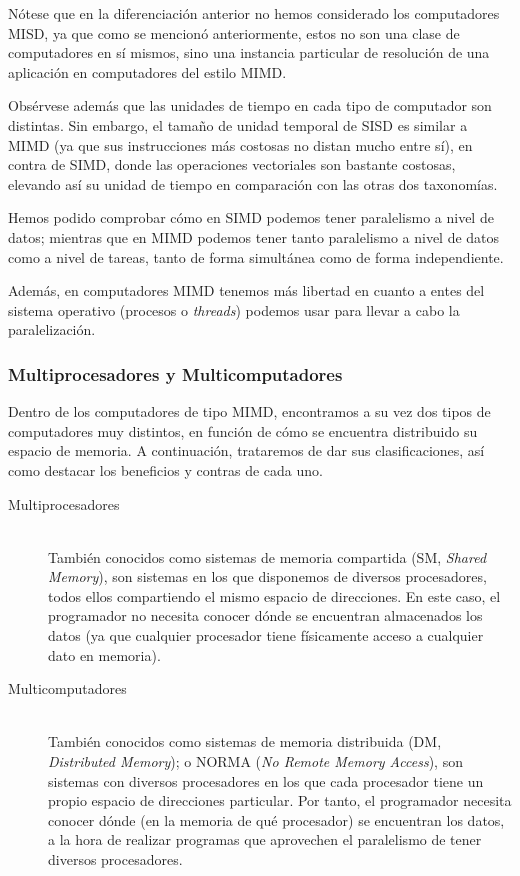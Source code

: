 \begin{observacion}
    Nótese que en la diferenciación anterior no hemos considerado los computadores MISD, ya que como se mencionó anteriormente, estos no son una clase de computadores en sí mismos, sino una instancia particular de resolución de una aplicación en computadores del estilo MIMD.

    Obsérvese además que las unidades de tiempo en cada tipo de computador son distintas. Sin embargo, el tamaño de unidad temporal de SISD es similar a MIMD (ya que sus instrucciones más costosas no distan mucho entre sí), en contra de SIMD, donde las operaciones vectoriales son bastante costosas, elevando así su unidad de tiempo en comparación con las otras dos taxonomías.

    Hemos podido comprobar cómo en SIMD podemos tener paralelismo a nivel de datos; mientras que en MIMD podemos tener tanto paralelismo a nivel de datos como a nivel de tareas, tanto de forma simultánea como de forma independiente.

    Además, en computadores MIMD tenemos más libertad en cuanto a entes del sistema operativo (procesos o \emph{threads}) podemos usar para llevar a cabo la paralelización.
\end{observacion}

\subsubsection{Multiprocesadores y Multicomputadores}
Dentro de los computadores de tipo MIMD, encontramos a su vez dos tipos de computadores muy distintos, en función de cómo se encuentra distribuido su espacio de memoria. A continuación, trataremos de dar sus clasificaciones, así como destacar los beneficios y contras de cada uno.
\begin{description}
    \item [Multiprocesadores]~\\
        También conocidos como sistemas de memoria compartida (SM, \emph{Shared Memory}), son sistemas en los que disponemos de diversos procesadores, todos ellos compartiendo el mismo espacio de direcciones. En este caso, el programador no necesita conocer dónde se encuentran almacenados los datos (ya que cualquier procesador tiene físicamente acceso a cualquier dato en memoria).
    \item [Multicomputadores]~\\
        También conocidos como sistemas de memoria distribuida (DM, \emph{Distributed Memory}); o NORMA (\emph{No Remote Memory Access}), son sistemas con diversos procesadores en los que cada procesador tiene un propio espacio de direcciones particular. Por tanto, el programador necesita conocer dónde (en la memoria de qué procesador) se encuentran los datos, a la hora de realizar programas que aprovechen el paralelismo de tener diversos procesadores.
\end{description}

